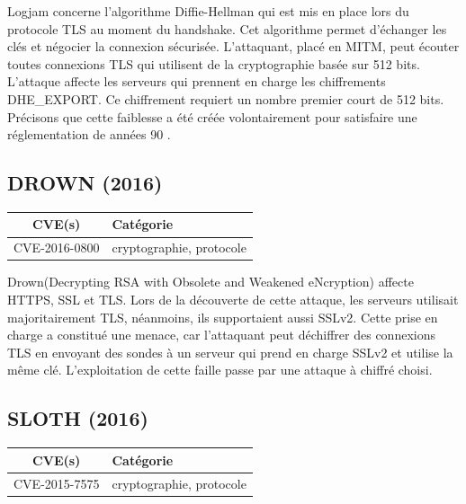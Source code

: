 \vspace{1em}

Logjam concerne l'algorithme Diffie-Hellman qui est mis en place lors du protocole TLS au moment du handshake. Cet algorithme permet d'échanger les clés et négocier la connexion sécurisée. L'attaquant, placé en MITM, peut écouter toutes connexions TLS qui utilisent de la cryptographie basée sur 512 bits. L'attaque affecte les serveurs qui prennent en charge les chiffrements DHE\_EXPORT. Ce chiffrement requiert un nombre premier court de 512 bits. Précisons que cette faiblesse a été créée volontairement pour satisfaire une réglementation de années 90
\cite{logjam}.




\subsection{DROWN (2016)}

\begin{tabularx}{0.96\textwidth}{|c|X|}
  \hline
  \textbf{CVE(s)} & \textbf{Catégorie} \\
  \hline
  CVE-2016-0800 & cryptographie, protocole \\
  \hline
\end{tabularx}

\vspace{1em}

Drown(Decrypting RSA with Obsolete and Weakened eNcryption) affecte HTTPS, SSL et TLS. Lors de la découverte de cette attaque, les serveurs utilisait majoritairement TLS, néanmoins, ils supportaient aussi SSLv2. Cette prise en charge a constitué une menace, car l'attaquant peut déchiffrer des connexions TLS en envoyant des sondes à un serveur qui prend en charge SSLv2 et utilise la même clé. L'exploitation de cette faille passe par une attaque à chiffré choisi\cite{drown}.




\subsection{SLOTH (2016)}

\begin{tabularx}{0.96\textwidth}{|c|X|}
  \hline
  \textbf{CVE(s)} & \textbf{Catégorie} \\
  \hline
  CVE-2015-7575 & cryptographie, protocole \\
  \hline
\end{tabularx}

